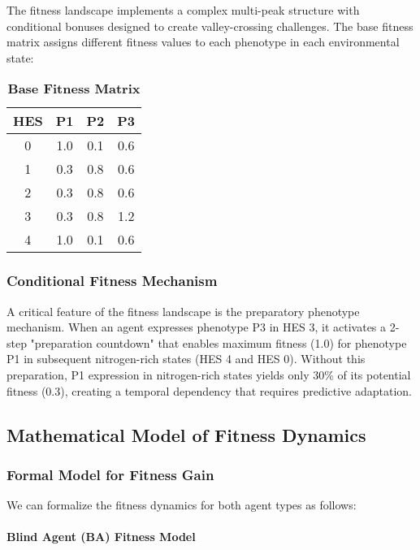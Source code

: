 \documentclass[aps,pre,twocolumn,floatfix,nofootinbib,amsmath,amssymb]{revtex4-2}
\begin{document}
The fitness landscape implements a complex multi-peak structure with conditional bonuses designed to create valley-crossing challenges. The base fitness matrix assigns different fitness values to each phenotype in each environmental state:

\begin{table}[H]
\centering
\caption{\textbf{Base Fitness Matrix}}
\label{tab:base_fitness}
\begin{tabular}{@{}cccc@{}}
\toprule
HES & P1 & P2 & P3 \\
\midrule
0 & 1.0 & 0.1 & 0.6 \\
1 & 0.3 & 0.8 & 0.6 \\
2 & 0.3 & 0.8 & 0.6 \\
3 & 0.3 & 0.8 & 1.2 \\
4 & 1.0 & 0.1 & 0.6 \\
\bottomrule
\end{tabular}
\end{table}

\subsubsection{Conditional Fitness Mechanism}

A critical feature of the fitness landscape is the preparatory phenotype mechanism. When an agent expresses phenotype P3 in HES 3, it activates a 2-step "preparation countdown" that enables maximum fitness (1.0) for phenotype P1 in subsequent nitrogen-rich states (HES 4 and HES 0). Without this preparation, P1 expression in nitrogen-rich states yields only 30\% of its potential fitness (0.3), creating a temporal dependency that requires predictive adaptation.

\subsection{Mathematical Model of Fitness Dynamics}

\subsubsection{Formal Model for Fitness Gain}

We can formalize the fitness dynamics for both agent types as follows:

\paragraph{Blind Agent (BA) Fitness Model}
\end{document}
